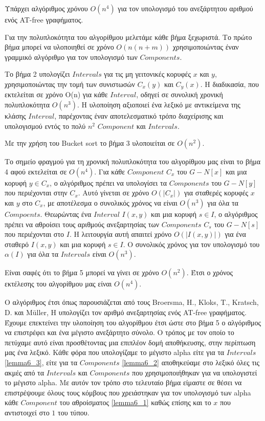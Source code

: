 \begin{definition}
	Υπάρχει αλγόριθμος χρόνου $O(n^4)$ για τον υπολογισμό του ανεξάρτητου αριθμού ενός AT-free γραφήματος.
\end{definition}

Για την πολυπλοκότητα του αλγορίθμου μελετάμε κάθε βήμα ξεχωριστά. Το πρώτο βήμα μπορεί να υλοποιηθεί σε χρόνο $O(n(n + m))$ χρησιμοποιώντας έναν γραμμικό αλγόριθμο για τον υπολογισμό των $Components$. 

Το βήμα 2 υπολογίζει $Intervals$ για τις μη γειτονικές κορυφές $x$ και $y$, χρησιμοποιώντας την τομή των συνιστωσών $C_x(y)$ και $C_y(x)$. Η διαδικασία, που εκτελείται σε χρόνο O(n) για κάθε $Interval$, οδηγεί σε συνολική χρονική πολυπλοκότητα $O(n^3)$. Η υλοποίηση αξιοποιεί ένα λεξικό με αντικείμενα της κλάσης $Interval$, παρέχοντας έναν αποτελεσματικό τρόπο διαχείρισης και υπολογισμού εντός το πολύ $n^2$ $Component$ και $Intervals$.

Με την χρήση του Bucket sort το βήμα 3 υλοποιείται σε $O(n^2)$.

Το σημείο φραγμού για τη χρονική πολυπλοκότητα του αλγορίθμου μας είναι το βήμα 4 αφού εκτελείται σε $O(n^4)$. Για κάθε $Component$ $C_x$ του $G - N[x]$ και μια κορυφή $y \in C_x$, ο αλγόριθμος πρέπει να υπολογίσει τα $Components$ του $G - N[y]$ που περιέχονται στην $C_x$. Αυτό γίνεται σε χρόνο $O(|C_x|)$ για σταθερές κορυφές $x$ και $y$ στο $C_x$, με αποτέλεσμα ο συνολικός χρόνος να είναι $O(n^3)$ για όλα τα $Compoents$. Θεωρώντας ένα $Interval$ $I(x, y)$ και μια κορυφή $s \in I$, ο αλγόριθμος πρέπει να αθροίσει τους αριθμούς ανεξαρτησίας των $Components$ $C_s$ του $G - N[s]$ που περιέχονται στο $I$. Η λειτουργία αυτή απαιτεί χρόνο $O(|I(x, y)|)$ για ένα σταθερό $I(x, y)$ και μια κορυφή $s \in I$. Ο συνολικός χρόνος για τον υπολογισμό του $\alpha(I)$ για όλα τα $Intervals$ είναι $O(n^3)$.

Είναι σαφές ότι το βήμα 5 μπορεί να γίνει σε χρόνο $O(n^2)$. Έτσι ο χρόνος εκτέλεσης του αλγορίθμου μας
είναι $O(n^4)$.

Ο αλγόριθμος έτσι όπως παρουσιάζεται από τους Broersma, H., Kloks, T., Kratsch, D. και Müller, H υπολογίζει τον αριθμό ανεξαρτησίας ενός AT-free γραφήματος. Έχουμε επεκτείνει την υλοποίηση του αλγορίθμου έτσι ώστε στο βήμα 5 ο αλγόριθμος να επιστρέφει και ένα μέγιστο ανεξάρτητο σύνολο. Ο τρόπος με τον οποίο το πετύχαμε αυτό είναι προσθέτοντας μια επιπλέον δομή αποθήκευσης, στην περίπτωση μας ένα λεξικό. Κάθε φόρα που υπολογίζαμε το μέγιστο alpha είτε για τα $Intervals$ \ref{lemma6_3}, είτε για τα $Components$ \ref{lemma6_2} αποθηκεύαμε στο λεξικό όλες τις ακμές από τα $Intervals$ και $Components$ που χρησιμοποιήθηκαν για να υπολογιστεί το μέγιστο alpha. Με αυτόν τον τρόπο στο τελευταίο βήμα είμαστε σε θέσει να επιστρέψουμε όλους τους κόμβους που χρειάστηκαν για τον υπολογισμό των alpha κάθε $Component$ του αθροίσματος \ref{lemma6_1} καθώς επίσης και το $x$ που αντιστοιχεί στο $1$ του τύπου.  

